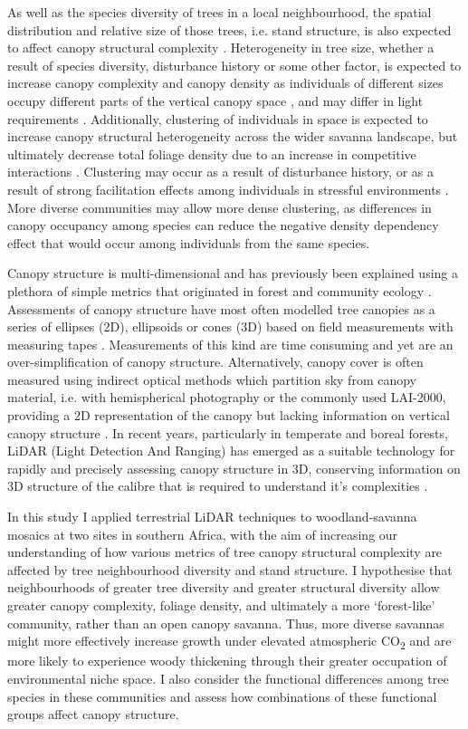 \documentclass[11pt,a4paper]{article}
\begin{document}
As well as the species diversity of trees in a local neighbourhood, the spatial distribution and relative size of those trees, i.e. stand structure, is also expected to affect canopy structural complexity \citep{Stark2015}. Heterogeneity in tree size, whether a result of species diversity, disturbance history or some other factor, is expected to increase canopy complexity and canopy density as individuals of different sizes occupy different parts of the vertical canopy space \citep{Panzou2020}, and may differ in light requirements \citep{CharlesDominique2018}. Additionally, clustering of individuals in space is expected to increase canopy structural heterogeneity across the wider savanna landscape, but ultimately decrease total foliage density due to an increase in competitive interactions \citep{Dohn2017}. Clustering may occur as a result of disturbance history, or as a result of strong facilitation effects among individuals in stressful environments \citep{Ratcliffe2017}. More diverse communities may allow more dense clustering, as differences in canopy occupancy among species can reduce the negative density dependency effect that would occur among individuals from the same species.

Canopy structure is multi-dimensional and has previously been explained using a plethora of simple metrics that originated in forest and community ecology \citep{Kershaw2017}. Assessments of canopy structure have most often modelled tree canopies as a series of ellipses (2D), ellipsoids or cones (3D) based on field measurements with measuring tapes \citep{Jucker2015}. Measurements of this kind are time consuming and yet are an over-simplification of canopy structure. Alternatively, canopy cover is often measured using indirect optical methods which partition sky from canopy material, i.e. with hemispherical photography or the commonly used LAI-2000, providing a 2D representation of the canopy but lacking information on vertical canopy structure \citep{Jonckheere2004}. In recent years, particularly in temperate and boreal forests, LiDAR (Light Detection And Ranging) has emerged as a suitable technology for rapidly and precisely assessing canopy structure in 3D, conserving information on 3D structure of the calibre that is required to understand it's complexities \citep{Muir2018, Calders2020}.

In this study I applied terrestrial LiDAR techniques to woodland-savanna mosaics at two sites in southern Africa, with the aim of increasing our understanding of how various metrics of tree canopy structural complexity are affected by tree neighbourhood diversity and stand structure. I hypothesise that neighbourhoods of greater tree diversity and greater structural diversity allow greater canopy complexity, foliage density, and ultimately a more `forest-like' community, rather than an open canopy savanna. Thus, more diverse savannas might more effectively increase growth under elevated atmospheric CO\textsubscript{2} and are more likely to experience woody thickening through their greater occupation of environmental niche space. I also consider the functional differences among tree species in these communities and assess how combinations of these functional groups affect canopy structure.
\end{document}

